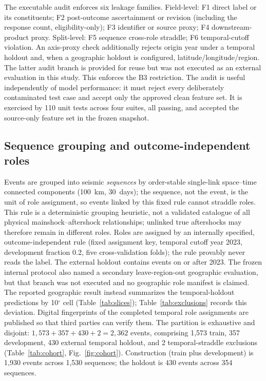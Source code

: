 \documentclass[pdflatex,sn-basic,iicol]{sn-jnl}
\begin{document}
The executable audit enforces six leakage families. Field-level: F1 direct
label or its constituents; F2 post-outcome ascertainment or revision (including
the response count, eligibility-only); F3 identifier or source proxy; F4
downstream-product proxy. Split-level: F5 sequence cross-role straddle; F6
temporal-cutoff violation. An axis-proxy check additionally rejects origin year
under a temporal holdout and, when a geographic holdout is configured,
latitude/longitude/region. The latter audit branch is provided for reuse but was
not executed as an external evaluation in this study. This enforces the B3
restriction. The audit is useful independently of
model performance: it must reject every deliberately contaminated test case and
accept only the approved clean feature set. It is exercised by 110 unit tests
across four suites, all passing, and accepted the source-only feature set in the
frozen snapshot.

\subsection{Sequence grouping and outcome-independent roles}\label{sec:roles}

Events are grouped into seismic \emph{sequences} by order-stable single-link
space--time connected components (100~km, 30~days); the sequence, not the event,
is the unit of role assignment, so events linked by this fixed rule cannot
straddle roles. This rule is a deterministic grouping heuristic, not a validated
catalogue of all physical mainshock--aftershock relationships; unlinked true
aftershocks may therefore remain in different roles. Roles are
assigned by an internally specified, outcome-independent rule (fixed assignment key,
temporal cutoff year 2023, development fraction 0.2, five cross-validation
folds); the rule provably never reads the label. The external holdout contains
events on or after 2023. The frozen internal protocol also named a secondary
leave-region-out geographic evaluation, but that branch was not executed and no
geographic role manifest is claimed. The reported geographic result instead
summarizes the temporal-holdout predictions by 10$^\circ$ cell
(Table~\ref{tab:slices}); Table~\ref{tab:exclusions} records this deviation.
Digital fingerprints of the completed temporal role assignments are published
so that third parties can verify them. The
partition is exhaustive and disjoint:
$1{,}573+357+430+2=2{,}362$ events, comprising 1{,}573 train, 357 development,
430 external temporal holdout, and 2 temporal-straddle exclusions
(Table~\ref{tab:cohort}, Fig.~\ref{fig:cohort}). Construction (train plus
development) is 1{,}930 events across 1{,}530 sequences; the holdout is 430
events across 354 sequences.
\end{document}
